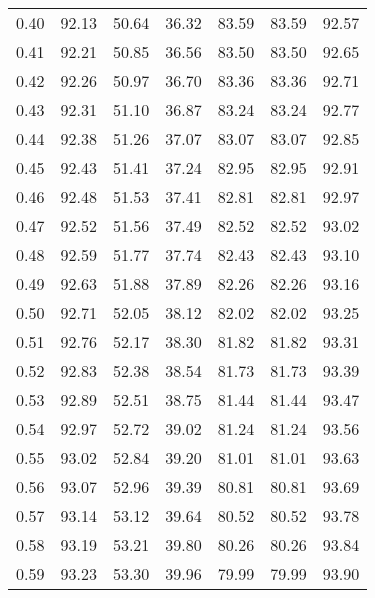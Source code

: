 \begin{tabular}{|c|c|c|c|c|c|c|}
      0.40 &     92.13 &     50.64 &      36.32 &   83.59 &      83.59 &         92.57 \\
      0.41 &     92.21 &     50.85 &      36.56 &   83.50 &      83.50 &         92.65 \\
      0.42 &     92.26 &     50.97 &      36.70 &   83.36 &      83.36 &         92.71 \\
      0.43 &     92.31 &     51.10 &      36.87 &   83.24 &      83.24 &         92.77 \\
      0.44 &     92.38 &     51.26 &      37.07 &   83.07 &      83.07 &         92.85 \\
      0.45 &     92.43 &     51.41 &      37.24 &   82.95 &      82.95 &         92.91 \\
      0.46 &     92.48 &     51.53 &      37.41 &   82.81 &      82.81 &         92.97 \\
      0.47 &     92.52 &     51.56 &      37.49 &   82.52 &      82.52 &         93.02 \\
      0.48 &     92.59 &     51.77 &      37.74 &   82.43 &      82.43 &         93.10 \\
      0.49 &     92.63 &     51.88 &      37.89 &   82.26 &      82.26 &         93.16 \\
      0.50 &     92.71 &     52.05 &      38.12 &   82.02 &      82.02 &         93.25 \\
      0.51 &     92.76 &     52.17 &      38.30 &   81.82 &      81.82 &         93.31 \\
      0.52 &     92.83 &     52.38 &      38.54 &   81.73 &      81.73 &         93.39 \\
      0.53 &     92.89 &     52.51 &      38.75 &   81.44 &      81.44 &         93.47 \\
      0.54 &     92.97 &     52.72 &      39.02 &   81.24 &      81.24 &         93.56 \\
      0.55 &     93.02 &     52.84 &      39.20 &   81.01 &      81.01 &         93.63 \\
      0.56 &     93.07 &     52.96 &      39.39 &   80.81 &      80.81 &         93.69 \\
      0.57 &     93.14 &     53.12 &      39.64 &   80.52 &      80.52 &         93.78 \\
      0.58 &     93.19 &     53.21 &      39.80 &   80.26 &      80.26 &         93.84 \\
      0.59 &     93.23 &     53.30 &      39.96 &   79.99 &      79.99 &         93.90 \\

\end{tabular}

